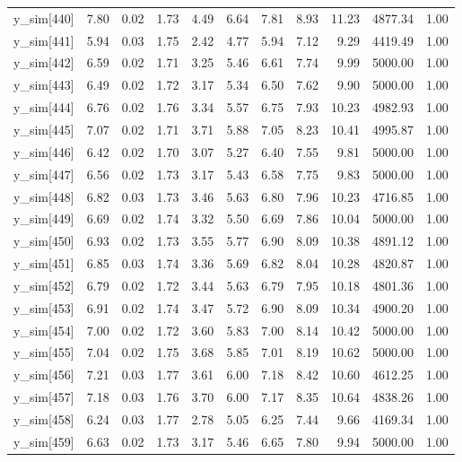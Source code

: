 \begin{table}[ht]
\begin{tabular}{rrrrrrrrrrr}
  y\_sim[440] & 7.80 & 0.02 & 1.73 & 4.49 & 6.64 & 7.81 & 8.93 & 11.23 & 4877.34 & 1.00 \\ 
  y\_sim[441] & 5.94 & 0.03 & 1.75 & 2.42 & 4.77 & 5.94 & 7.12 & 9.29 & 4419.49 & 1.00 \\ 
  y\_sim[442] & 6.59 & 0.02 & 1.71 & 3.25 & 5.46 & 6.61 & 7.74 & 9.99 & 5000.00 & 1.00 \\ 
  y\_sim[443] & 6.49 & 0.02 & 1.72 & 3.17 & 5.34 & 6.50 & 7.62 & 9.90 & 5000.00 & 1.00 \\ 
  y\_sim[444] & 6.76 & 0.02 & 1.76 & 3.34 & 5.57 & 6.75 & 7.93 & 10.23 & 4982.93 & 1.00 \\ 
  y\_sim[445] & 7.07 & 0.02 & 1.71 & 3.71 & 5.88 & 7.05 & 8.23 & 10.41 & 4995.87 & 1.00 \\ 
  y\_sim[446] & 6.42 & 0.02 & 1.70 & 3.07 & 5.27 & 6.40 & 7.55 & 9.81 & 5000.00 & 1.00 \\ 
  y\_sim[447] & 6.56 & 0.02 & 1.73 & 3.17 & 5.43 & 6.58 & 7.75 & 9.83 & 5000.00 & 1.00 \\ 
  y\_sim[448] & 6.82 & 0.03 & 1.73 & 3.46 & 5.63 & 6.80 & 7.96 & 10.23 & 4716.85 & 1.00 \\ 
  y\_sim[449] & 6.69 & 0.02 & 1.74 & 3.32 & 5.50 & 6.69 & 7.86 & 10.04 & 5000.00 & 1.00 \\ 
  y\_sim[450] & 6.93 & 0.02 & 1.73 & 3.55 & 5.77 & 6.90 & 8.09 & 10.38 & 4891.12 & 1.00 \\ 
  y\_sim[451] & 6.85 & 0.03 & 1.74 & 3.36 & 5.69 & 6.82 & 8.04 & 10.28 & 4820.87 & 1.00 \\ 
  y\_sim[452] & 6.79 & 0.02 & 1.72 & 3.44 & 5.63 & 6.79 & 7.95 & 10.18 & 4801.36 & 1.00 \\ 
  y\_sim[453] & 6.91 & 0.02 & 1.74 & 3.47 & 5.72 & 6.90 & 8.09 & 10.34 & 4900.20 & 1.00 \\ 
  y\_sim[454] & 7.00 & 0.02 & 1.72 & 3.60 & 5.83 & 7.00 & 8.14 & 10.42 & 5000.00 & 1.00 \\ 
  y\_sim[455] & 7.04 & 0.02 & 1.75 & 3.68 & 5.85 & 7.01 & 8.19 & 10.62 & 5000.00 & 1.00 \\ 
  y\_sim[456] & 7.21 & 0.03 & 1.77 & 3.61 & 6.00 & 7.18 & 8.42 & 10.60 & 4612.25 & 1.00 \\ 
  y\_sim[457] & 7.18 & 0.03 & 1.76 & 3.70 & 6.00 & 7.17 & 8.35 & 10.64 & 4838.26 & 1.00 \\ 
  y\_sim[458] & 6.24 & 0.03 & 1.77 & 2.78 & 5.05 & 6.25 & 7.44 & 9.66 & 4169.34 & 1.00 \\ 
  y\_sim[459] & 6.63 & 0.02 & 1.73 & 3.17 & 5.46 & 6.65 & 7.80 & 9.94 & 5000.00 & 1.00 \\ 

\end{tabular}
\end{table}
